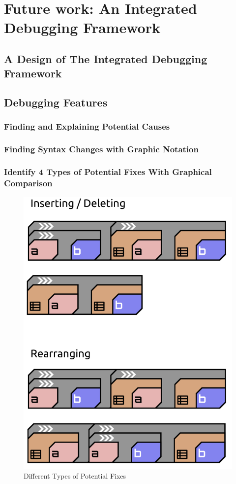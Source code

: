 


\chapter{Future work: An Integrated Debugging Framework}\label{chap:future-work} 

\section{A Design of The Integrated Debugging Framework}

\section{Debugging Features}
\subsection{Finding and Explaining Potential Causes}

\subsection{Finding Syntax Changes with Graphic Notation}

\subsection{Identify 4 Types of Potential Fixes With Graphical Comparison}

 \begin{figure}[htp]
        \centering
        \includegraphics[width=0.5\linewidth]{Figures/TypesOfCauses}
        \caption{Different Types of Potential Fixes}
        \label{fig:type_of_fix}
    \end{figure}

